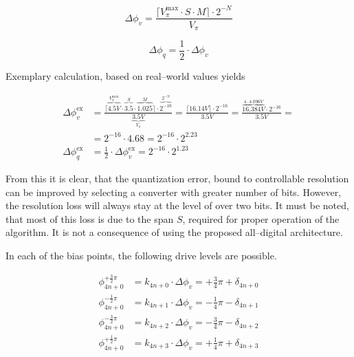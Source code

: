 \documentclass{article}
\begin{document}
\begin{equation}
    \Delta\phi_{v} = \frac{\lceil V_{\pi}^{\text{max}} \cdot S \cdot M \rceil \cdot 2^{-N}}{V_{\pi}}
    \label{eq:total_error}
\end{equation}

\begin{equation}
    \Delta\phi_{q} = \frac{1}{2} \cdot \Delta\phi_{v}
    \label{eq:relative_scale_factor_error}
\end{equation}

\noindent
Exemplary calculation, based on real--world values yields

\begin{equation}
    \begin{split}
        \Delta\phi_{v}^{\text{ex}} & = \frac{\lceil \overbrace{4.5V}^{V_{\pi}^{\text{max}}} \cdot \overbrace{3.5}^{S} \cdot \overbrace{1.025}^{M} \rceil \cdot \overbrace{2^{-16}}^{2^{-N}} }{\underbrace{3.5V}_{V_{\pi}}} = \frac{\lceil 16.14V \rceil \cdot 2^{-16}}{3.5V} = \frac{\overbrace{16.384V}^{4 \cdot 4.096V} \cdot 2^{-16}}{3.5V} = \\
                                   & = 2^{-16} \cdot 4.68 = 2^{-16} \cdot 2^{2.23}                                                                                                                                                                                                                                                               \\
        \Delta\phi_{q}^{\text{ex}} & = \frac{1}{2} \cdot \Delta\phi_{v}^{\text{ex}} = 2^{-16} \cdot 2^{1.23}
    \end{split}
    \label{eq:error_example}
\end{equation}

\noindent
From this it is clear, that the quantization error, bound to controllable resolution can be improved by selecting a converter with greater number of bits.
However, the resolution loss will always stay at the level of over two bits. It must be noted, that most of this loss is due to the span $S$, required for proper operation of the algorithm. It is not a consequence of using the proposed all--digital architecture.

\noindent
In each of the bias points, the following drive levels are possible.

\begin{equation}
    \begin{split}
        \phi_{4n+0}^{+\frac{3}{2}\pi} & = k_{4n+0} \cdot \Delta\phi_{v} = +\frac{3}{4}\pi + \delta_{4n+0} \\
        \phi_{4n+0}^{-\frac{1}{2}\pi} & = k_{4n+1} \cdot \Delta\phi_{v} = -\frac{1}{4}\pi - \delta_{4n+1} \\
        \phi_{4n+0}^{-\frac{3}{2}\pi} & = k_{4n+2} \cdot \Delta\phi_{v} = -\frac{3}{4}\pi - \delta_{4n+2} \\
        \phi_{4n+0}^{+\frac{1}{2}\pi} & = k_{4n+3} \cdot \Delta\phi_{v} = +\frac{1}{4}\pi + \delta_{4n+3}
    \end{split}
    \label{eq:22213}
\end{equation}
\end{document}
